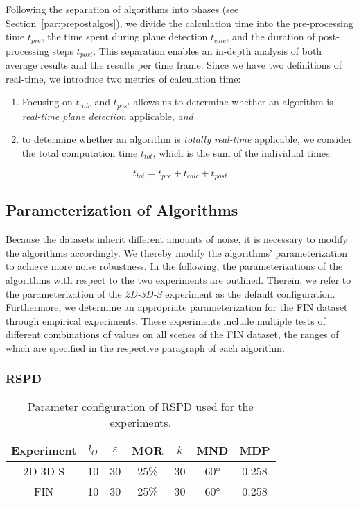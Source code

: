 \documentclass[main.tex]{subfiles}
\begin{document}
Following the separation of algorithms into phases (see Section~\ref{par:prepostalgos}), 
we divide the calculation time into the pre-processing time $t_{pre}$, 
the time spent during plane detection $t_{calc}$, and the duration of post-processing steps $t_{post}$.
This separation enables an in-depth analysis of both average results and the results per time frame.
Since we have two definitions of real-time, we introduce two metrics of calculation time:

\begin{enumerate}
    \item Focusing on $t_{calc}$ and $t_{post}$ allows us to determine whether an algorithm is \textit{real-time plane detection} applicable, \textit{and}
    \item to determine whether an algorithm is \textit{totally real-time} applicable, we consider the total computation time 
    $t_{tot}$, which is the sum of the individual times:
\end{enumerate}


\begin{equation}
    t_{tot} = t_{pre} + t_{calc} + t_{post}
\end{equation}

\subsection{Parameterization of Algorithms}
Because the datasets inherit different amounts of noise, it is necessary to modify the algorithms accordingly.
We thereby modify the algorithms' parameterization to achieve more noise robustness.
In the following, the parameterizations of the algorithms with respect to the two experiments are outlined.
Therein, we refer to the parameterization of the \textit{2D-3D-S} experiment as the default configuration.
Furthermore, we determine an appropriate parameterization for the FIN dataset through
empirical experiments. These experiments include multiple tests of different combinations of values on all scenes of the FIN dataset,
the ranges of which are specified in the respective paragraph of each algorithm.


\subsubsection{RSPD}
\begin{table}[H]
    \centering
    \begin{tabular}{c|cccccc}
        Experiment & $l_O$ & $\varepsilon$ & MOR  & $k$ & MND & MDP   \\ \hline
        2D-3D-S    & 10    & 30            & 25\% & 30  & 60° & 0.258 \\
        FIN        & 10    & 30            & 25\% & 30  & 60° & 0.258
    \end{tabular}%
    \caption{Parameter configuration of RSPD used for the experiments.}
    \label{tab:rspd-param}
\end{table}
\end{document}

